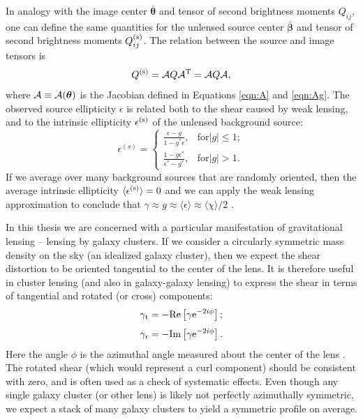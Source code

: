 In analogy with the image center $\bm{\bar{\theta}}$ and tensor of second brightness moments $Q_{ij}$, one can define the same quantities for the unlensed source center $\bm{\bar{\beta}}$ and tensor of second brightness moments $Q_{ij}^{\rm (s)}$. The relation between the source and image tensors is
\begin{equation}
Q^{\rm (s)} = {\cal A} Q {\cal A}^{\rm T} = {\cal A} Q {\cal A},
\end{equation}
where ${\cal A} \equiv {\cal A}(\bm{\theta})$ is the Jacobian defined in Equations \ref{eqn:A} and \ref{eqn:Ag}. The observed source ellipticity $\epsilon$ is related both to the shear caused by weak lensing, and to the intrinsic ellipticity $\epsilon^{\rm (s)}$ of the unlensed background source:
\begin{equation} 
\epsilon^{(s)} = 
    \begin{cases}
        \frac{\epsilon - g}{1-g^*\epsilon}, & \text{for} |g| \le 1; \\
        \frac{1-g\epsilon^*}{\epsilon^* - g^*}, & \text{for} |g| > 1.
    \end{cases}
\end{equation}
If we average over many background sources that are randomly oriented, then the average intrinsic ellipticity $\langle \epsilon^{\rm (s)} \rangle = 0$ and we can apply the weak lensing approximation to conclude that $\gamma \approx g \approx \langle \epsilon \rangle \approx  \langle \chi \rangle /2$ \citep{BS01}. 

In this thesis we are concerned with a particular manifestation of gravitational lensing -- lensing by galaxy clusters. If we consider a circularly symmetric mass density on the sky (an idealized galaxy cluster), then we expect the shear distortion to be oriented tangential to the center of the lens. It is therefore useful in cluster lensing (and also in galaxy-galaxy lensing) to express the shear in terms of tangential and rotated (or cross) components:
\begin{equation}
\label{EQ:gammat}
\gamma_{\rm t} = -{\rm Re}\left[ \gamma {\rm e}^{-2i\phi} \right];  
\end{equation}
\begin{equation}
\label{EQ:gammar}
\gamma_{\rm r} = -{\rm Im}\left[ \gamma {\rm e}^{-2i\phi} \right].
\end{equation}
Here the angle $\phi$ is the azimuthal angle measured about the center of the lens \citep{Schneider06_WeakGravLens}. The rotated shear (which would represent a curl component) should be consistent with zero, and is often used as a check of systematic effects. Even though any single galaxy cluster (or other lens) is likely not perfectly azimuthally symmetric, we expect a stack of many galaxy clusters to yield a symmetric profile on average.

